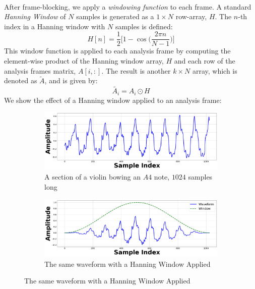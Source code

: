 \documentclass[12pt,letterpaper]{article}
\begin{document}
\paragraph*{}After frame-blocking, we apply a \textit{windowing function} to each frame. A standard \textit{Hanning Window} of $N$ samples is generated as a $1 \times N$ row-array, $H$. The $n$-th index in a Hanning window with $N$ samples is defined:
\begin{equation}
\label{eqn-Hanning}
H[n] = \frac{1}{2}\bigg[ 1 - \cos\Big( \frac{2\pi n}{N-1}\Big)\bigg]
\end{equation}
This window function is applied to each analysis frame by computing the element-wise product of the Hanning window array, $H$ and each row of the analysis frames matrix, $A[i,:]$. The result is another $k \times N$ array, which is denoted as $\widetilde{A}$, and is given by:
\begin{equation}
\label{eqn-WindowMatrix}
\widetilde{A_i} = A_i \odot H
\end{equation}
We show the effect of a Hanning window applied to an analysis frame:
\begin{figure}[H]

	\begin{subfigure}{1.0\textwidth}
	\centering
	\includegraphics[width=\textwidth , height=0.2\textheight]{../Figures/AnalysisFrame}
	\caption{A section of a violin bowing an $A4$ note, $1024$ samples long}
	\end{subfigure}	
	
	\begin{subfigure}{1.0\textwidth}
	\centering
	\includegraphics[width=\textwidth , height=0.2\textheight]{../Figures/WindowedFrame}
	\caption{The same waveform with a Hanning Window Applied}
	\end{subfigure}	

\end{figure}
\end{document}
